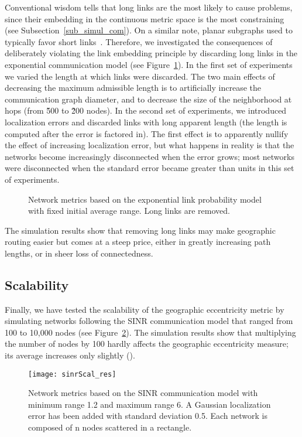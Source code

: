 \documentclass{article}
\begin{document}
Conventional wisdom tells that long links are the most likely to cause problems, since their embedding in the continuous metric space is the most constraining (see Subsection~\ref{sub_simul_com}). On a similar note, planar subgraphs used to typically favor short links~\cite{bib_book}. Therefore, we investigated the consequences of deliberately violating the link embedding principle by discarding long links in the exponential communication model (see Figure~\ref{fig_exp_tr}).
In the first set of experiments we varied the length at which links were discarded. The two main effects of decreasing the maximum admissible length is to artificially increase the communication graph diameter, and to decrease the size of the neighborhood at  hops (from \~500 to \~200 nodes). In the second set of experiments, we introduced localization errors and discarded links with long apparent length (the length is computed after the error is factored in). The first effect is to apparently nullify the effect of increasing localization error, but what happens in reality is that the networks become increasingly disconnected when the error grows; most networks were disconnected when the standard error became greater than  units in this set of experiments.
\begin{figure}[h]
\begin{center}
\caption{Network metrics based on the exponential link probability model with fixed initial average range. Long links are removed.}
\label{fig_exp_tr}
\end{center}
\end{figure}

The simulation results show that removing long links may make geographic routing easier but comes at a steep price, either in greatly increasing path lengths, or in sheer loss of connectedness.

\subsection{Scalability}
Finally, we have tested the scalability of the geographic eccentricity metric by simulating networks following the SINR communication model that ranged from 100 to 10,000 nodes (see Figure~\ref{fig_scal}). The simulation results show that multiplying the number of nodes by 100 hardly affects the geographic eccentricity measure; its average increases only slightly ().
\begin{figure}[h]
\begin{center}
\texttt{[image: sinrScal\_res]}
\caption{Network metrics based on the SINR communication model with minimum range 1.2 and maximum range 6. A Gaussian localization error has been added with standard deviation 0.5. Each network is composed of n nodes
scattered in a  rectangle.}
\label{fig_scal}
\end {center}
\end{figure}
\end{document}
